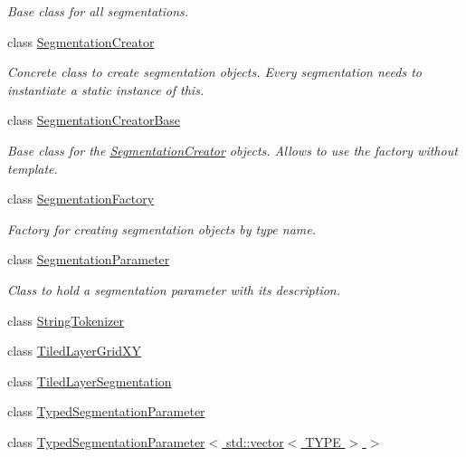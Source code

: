 \begin{DoxyCompactItemize}
\begin{DoxyCompactList}\small\item\em Base class for all segmentations. \end{DoxyCompactList}\item 
class \hyperlink{class_d_d4hep_1_1_d_d_segmentation_1_1_segmentation_creator}{Segmentation\+Creator}
\begin{DoxyCompactList}\small\item\em Concrete class to create segmentation objects. Every segmentation needs to instantiate a static instance of this. \end{DoxyCompactList}\item 
class \hyperlink{class_d_d4hep_1_1_d_d_segmentation_1_1_segmentation_creator_base}{Segmentation\+Creator\+Base}
\begin{DoxyCompactList}\small\item\em Base class for the \hyperlink{class_d_d4hep_1_1_d_d_segmentation_1_1_segmentation_creator}{Segmentation\+Creator} objects. Allows to use the factory without template. \end{DoxyCompactList}\item 
class \hyperlink{class_d_d4hep_1_1_d_d_segmentation_1_1_segmentation_factory}{Segmentation\+Factory}
\begin{DoxyCompactList}\small\item\em Factory for creating segmentation objects by type name. \end{DoxyCompactList}\item 
class \hyperlink{class_d_d4hep_1_1_d_d_segmentation_1_1_segmentation_parameter}{Segmentation\+Parameter}
\begin{DoxyCompactList}\small\item\em Class to hold a segmentation parameter with its description. \end{DoxyCompactList}\item 
class \hyperlink{class_d_d4hep_1_1_d_d_segmentation_1_1_string_tokenizer}{String\+Tokenizer}
\item 
class \hyperlink{class_d_d4hep_1_1_d_d_segmentation_1_1_tiled_layer_grid_x_y}{Tiled\+Layer\+Grid\+XY}
\item 
class \hyperlink{class_d_d4hep_1_1_d_d_segmentation_1_1_tiled_layer_segmentation}{Tiled\+Layer\+Segmentation}
\item 
class \hyperlink{class_d_d4hep_1_1_d_d_segmentation_1_1_typed_segmentation_parameter}{Typed\+Segmentation\+Parameter}
\item 
class \hyperlink{class_d_d4hep_1_1_d_d_segmentation_1_1_typed_segmentation_parameter_3_01std_1_1vector_3_01_t_y_p_e_01_4_01_4}{Typed\+Segmentation\+Parameter$<$ std\+::vector$<$ T\+Y\+P\+E $>$ $>$}

\end{DoxyCompactItemize}

